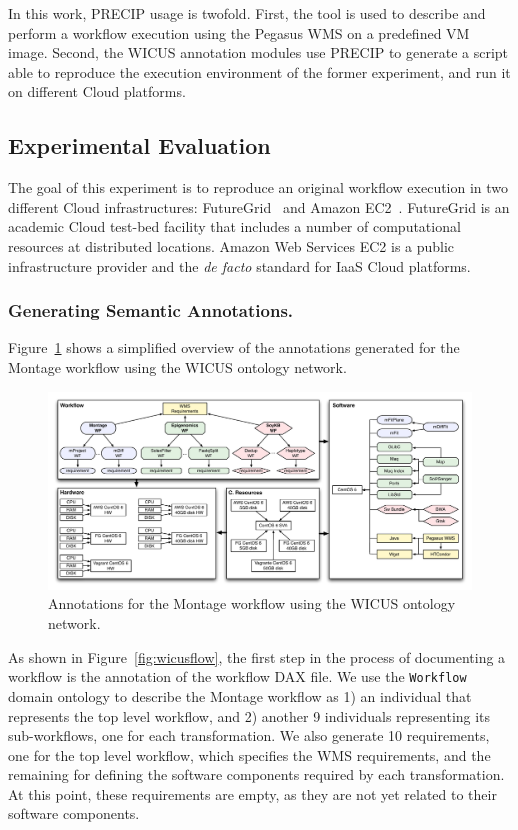\documentclass[final,5p,times,twocolumn]{elsarticle}
\begin{document}
In this work, PRECIP usage is twofold. First, the tool is used to describe and perform a workflow execution using the Pegasus WMS on a predefined VM image. Second, the WICUS annotation modules use PRECIP to generate a script able to reproduce the execution environment of the former experiment, and run it on different Cloud platforms.



\subsection{Experimental Evaluation}

The goal of this experiment is to reproduce an original workflow execution in two different Cloud infrastructures: FutureGrid~\cite{futuregrid} and Amazon EC2~\cite{aws}. FutureGrid is an academic Cloud test-bed facility that includes a number of computational resources at distributed locations. Amazon Web Services EC2 is a public infrastructure provider and the \emph{de facto} standard for IaaS Cloud platforms.



\subsubsection{Generating Semantic Annotations.}
Figure~\ref{fig:annotations} shows a simplified overview of the annotations generated for the Montage workflow using the WICUS ontology network.

\begin{figure}[!htb]
	\centering
	\includegraphics[width=\linewidth]{figures/annotations}
	\caption{Annotations for the Montage workflow using the WICUS ontology network.}
	\label{fig:annotations}
\end{figure}

 As shown in Figure~\ref{fig:wicusflow}, the first step in the process of documenting a workflow is the annotation of the workflow DAX file. We use the \texttt{Workflow} domain ontology to describe the Montage workflow as 1) an individual that represents the top level workflow, and 2) another 9 individuals representing its sub-workflows, one for each transformation. We also generate 10 requirements, one for the top level workflow, which specifies the WMS requirements, and the remaining for defining the software components required by each transformation. At this point, these requirements are empty, as they are not yet related to their software components.
 
\end{document}
